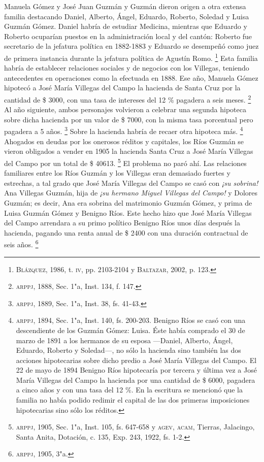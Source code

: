 \documentclass[14pt,twoside,final]{extbook} %
\let\oldfootnote\footnote
\renewcommand\footnote[1]{%
\oldfootnote{\hspace{1mm}#1}}
\begin{document}
Manuela Gómez y José Juan Guzmán y Guzmán dieron origen a otra extensa familia destacando Daniel, Alberto, Ángel, Eduardo, Roberto, Soledad y Luisa Guzmán Gómez. Daniel habría de estudiar Medicina, mientras que Eduardo y Roberto ocuparían puestos en la administración local y del cantón: Roberto fue secretario de la jefatura política en 1882-1883 y Eduardo se desempeñó como juez de primera instancia durante la jefatura política de Agustín Romo.\footnote{\textsc{Blázquez}, 1986, t. \textsc{iv}, pp. 2103-2104 y \textsc{Baltazar}, 2002, p. 123.} Esta familia habría de establecer relaciones sociales y de negocios con los Villegas, teniendo antecedentes en operaciones como la efectuada en 1888. Ese año, Manuela Gómez hipotecó a José María Villegas del Campo la hacienda de Santa Cruz por la cantidad de \$ 3000, con una tasa de intereses del 12 \% pagadera a seis meses.\footnote{\textsc{arppj}, 1888, Sec. 1"a, Inst. 134, f. 147.} Al año siguiente, ambos personajes volvieron a celebrar una segunda hipoteca sobre dicha hacienda por un valor de \$ 7000, con la misma tasa porcentual pero pagadera a 5 años.\footnote{\textsc{arppj}, 1889, Sec. 1"a, Inst. 38, fs. 41-43.} Sobre la hacienda habría de recaer otra hipoteca más.\footnote{\textsc{arppj}, 1894, Sec. 1"a, Inst. 140, fs. 200-203. Benigno Ríos se casó con una descendiente de los Guzmán Gómez: Luisa. Éste había comprado el 30 de marzo de 1891 a los hermanos de su esposa ---Daniel, Alberto, Ángel, Eduardo, Roberto y Soledad---, no sólo la hacienda sino también las dos acciones hipotecarias sobre dicho predio a José María Villegas del Campo. El 22 de mayo de 1894 Benigno Ríos hipotecaría por tercera y última vez a José María Villegas del Campo la hacienda por una cantidad de \$ 6000, pagadera a cinco años y con una tasa del 12 \%. En la escritura se mencionó que la familia no había podido redimir el capital de las dos primeras imposiciones hipotecarias sino sólo los réditos.} Ahogados en deudas por los onerosos réditos y capitales, los Ríos Guzmán se vieron obligados a vender en 1905 la hacienda Santa Cruz a José María Villegas del Campo por un total de \$ 40613.\footnote{\textsc{arppj}, 1905, Sec. 1"a, Inst. 105, fs. 647-658 y \textsc{agev, acam}, Tierras, Jalacingo, Santa Anita, Dotación, c. 135, Exp. 243, 1922, fs. 1-2.} El problema no paró ahí. Las relaciones familiares entre los Ríos Guzmán y los Villegas eran demasiado fuertes y estrechas, a tal grado que José María Villegas del Campo se casó con \emph{¡su sobrina!} Ana Villegas Guzmán, hija de \emph{¡su hermano Miguel Villegas del Campo!} y Dolores Guzmán; es decir, Ana era sobrina del matrimonio Guzmán Gómez, y prima de Luisa Guzmán Gómez y Benigno Ríos. Este hecho hizo que José María Villegas del Campo arrendara a su primo político Benigno Ríos unos días después la hacienda, pagando una renta anual de \$ 2400 con una duración contractual de seis años.\footnote{\textsc{arppj}, 1905, 3"a.}
\end{document}
